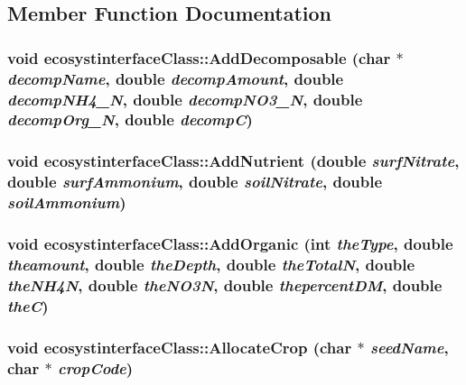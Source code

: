 \subsection{Member Function Documentation}
\hypertarget{classecosystinterface_class_a6941cd9aad0c1e2b20eedaf661c28894}{
\subsubsection[{AddDecomposable}]{\setlength{\rightskip}{0pt plus 5cm}void ecosystinterfaceClass::AddDecomposable (char $\ast$ {\em decompName}, \/  double {\em decompAmount}, \/  double {\em decompNH4\_\-N}, \/  double {\em decompNO3\_\-N}, \/  double {\em decompOrg\_\-N}, \/  double {\em decompC})}}
\label{classecosystinterface_class_a6941cd9aad0c1e2b20eedaf661c28894}
\hypertarget{classecosystinterface_class_a8eac6b15670e988eb7b23154b2728fa6}{
\subsubsection[{AddNutrient}]{\setlength{\rightskip}{0pt plus 5cm}void ecosystinterfaceClass::AddNutrient (double {\em surfNitrate}, \/  double {\em surfAmmonium}, \/  double {\em soilNitrate}, \/  double {\em soilAmmonium})}}
\label{classecosystinterface_class_a8eac6b15670e988eb7b23154b2728fa6}
\hypertarget{classecosystinterface_class_acb31d52f537a7bc32344b1df659c43c7}{
\subsubsection[{AddOrganic}]{\setlength{\rightskip}{0pt plus 5cm}void ecosystinterfaceClass::AddOrganic (int {\em theType}, \/  double {\em theamount}, \/  double {\em theDepth}, \/  double {\em theTotalN}, \/  double {\em theNH4N}, \/  double {\em theNO3N}, \/  double {\em thepercentDM}, \/  double {\em theC})}}
\label{classecosystinterface_class_acb31d52f537a7bc32344b1df659c43c7}
\hypertarget{classecosystinterface_class_a6e82d778908d98c7d1f8049ae69cefcd}{
\subsubsection[{AllocateCrop}]{\setlength{\rightskip}{0pt plus 5cm}void ecosystinterfaceClass::AllocateCrop (char $\ast$ {\em seedName}, \/  char $\ast$ {\em cropCode})}}
